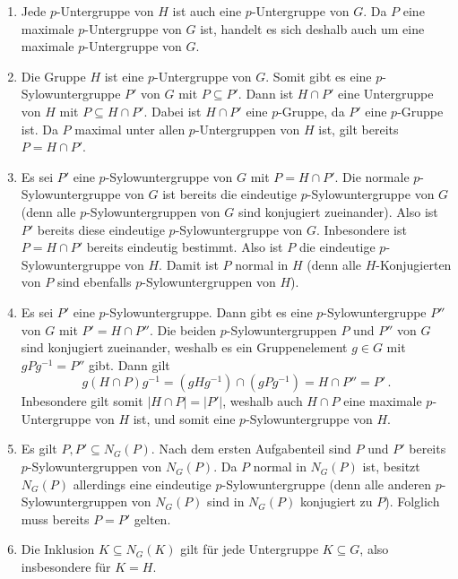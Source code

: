 \begin{solution}
  \begin{enumerate}
    \item
      Jede $p$-Untergruppe von $H$ ist auch eine $p$-Untergruppe von $G$.
      Da $P$ eine maximale $p$-Untergruppe von $G$ ist, handelt es sich deshalb auch um eine maximale $p$-Untergruppe von $G$.
    \item
      Die Gruppe $H$ ist eine $p$-Untergruppe von $G$.
      Somit gibt es eine $p$-Sylow\-unter\-gruppe $P'$ von $G$ mit $P \subseteq P'$.
      Dann ist $H \cap P'$ eine Untergruppe von $H$ mit $P \subseteq H \cap P'$.
      Dabei ist $H \cap P'$ eine $p$-Gruppe, da $P'$ eine $p$-Gruppe ist.
      Da $P$ maximal unter allen $p$-Untergruppen von $H$ ist, gilt bereits $P = H \cap P'$.
    \item
      Es sei $P'$ eine $p$-Sylow\-unter\-gruppe von $G$ mit $P = H \cap P'$.
      Die normale $p$-Sylow\-unter\-gruppe von $G$ ist bereits die eindeutige $p$-Sylow\-unter\-gruppe von $G$ (denn alle $p$-Sylow\-unter\-gruppen von $G$ sind konjugiert zueinander).
      Also ist $P'$ bereits diese eindeutige $p$-Sylow\-unter\-gruppe von $G$.
      Inbesondere ist $P = H \cap P'$ bereits eindeutig bestimmt.
      Also ist $P$ die eindeutige $p$-Sylow\-unter\-gruppe von $H$.
      Damit ist $P$ normal in $H$ (denn alle $H$-Konjugierten von $P$ sind ebenfalls $p$-Sylow\-unter\-gruppen von $H$).
    \item
      Es sei $P'$  eine $p$-Sylow\-unter\-gruppe.
      Dann gibt es eine $p$-Sylow\-unter\-gruppe $P''$ von $G$ mit $P' = H \cap P''$.
      Die beiden $p$-Sylow\-unter\-gruppen $P$ und $P''$ von $G$ sind konjugiert zueinander, weshalb es ein Gruppenelement $g \in G$ mit $gPg^{-1} = P''$ gibt.
      Dann gilt
      \[
          g(H \cap P)g^{-1}
        = (gHg^{-1}) \cap (gPg^{-1})
        = H \cap P''
        = P' \,.
      \]
      Inbesondere gilt somit $|H \cap P| = |P'|$, weshalb auch $H \cap P$ eine maximale $p$-Untergruppe von $H$ ist, und somit eine $p$-Sylow\-unter\-gruppe von $H$.
    \item
      Es gilt $P, P' \subseteq N_G(P)$.
      Nach dem ersten Aufgabenteil sind $P$ und $P'$ bereits $p$-Sylow\-unter\-gruppen von $N_G(P)$.
      Da $P$ normal in $N_G(P)$ ist, besitzt $N_G(P)$ allerdings eine eindeutige $p$-Sylow\-unter\-gruppe (denn alle anderen $p$-Sylow\-unter\-gruppen von $N_G(P)$ sind in $N_G(P)$ konjugiert zu $P$).
      Folglich muss bereits $P = P'$ gelten.
    \item
      Die Inklusion $K \subseteq N_G(K)$ gilt für jede Untergruppe $K \subseteq G$, also insbesondere für $K = H$.
      

\end{enumerate}
\end{solution}
